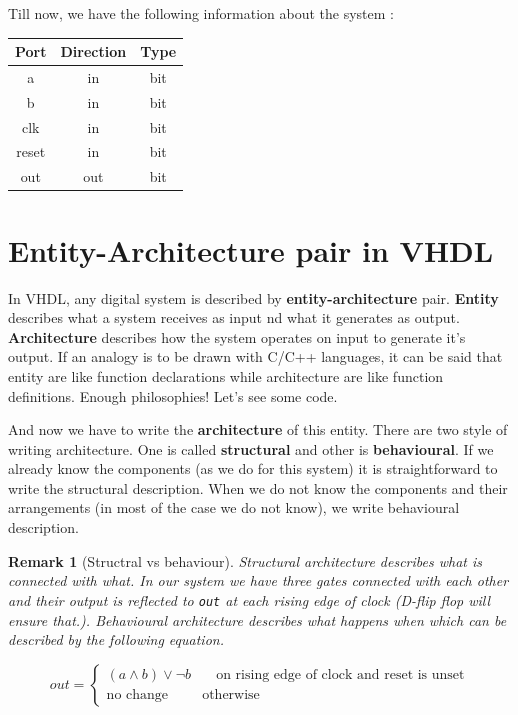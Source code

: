 \documentclass[a4paper,10pt]{article}
\newtheorem{remark}{Remark}
\begin{document}
  Till now, we have the following information about the system :

  \begin{table}[h] \centering \begin{tabular}{c|c|c} Port & Direction & Type \\
    \hline a & in & bit \\ b & in & bit \\ clk & in & bit \\ reset & in & bit \\
    out & out & bit \\ \hline \end{tabular} \end{table}


\section{Entity-Architecture pair in VHDL}
  
In VHDL, any digital system is described by \textbf{entity-architecture} pair.
\textbf{Entity} describes what a system receives as input nd what it generates
as output. \textbf{Architecture} describes how the system operates on input to
generate it's output. If an analogy is to be drawn with C/C++ languages, it can
be said that entity are like function declarations while architecture are like
function definitions. Enough philosophies! Let's see some code.



And now we have to write the \textbf{architecture} of this entity. There are two
style of writing architecture. One is called \textbf{structural} and other is
\textbf{behavioural}. If we already know the components (as we do for this
system) it is straightforward to write the structural description. When we do
not know the components and their arrangements (in most of the case we do not
know), we write behavioural description. 

\begin{remark}[Structral vs behaviour]
 
  Structural architecture describes \emph{what is connected with what}. In our
  system we have three gates connected with each other and their output is
  reflected to \texttt{out} at each rising edge of clock (D-flip flop will
  ensure that.). Behavioural architecture describes \emph{what happens when}
  which can be described by the following equation.

  \begin{equation} out = \begin{cases} (a \land b) \lor \neg b & \quad \text{on
    rising edge of clock and reset is unset}\\ \text{no change} &
    \text{otherwise} \end{cases} \end{equation} \end{remark}
\end{document}

